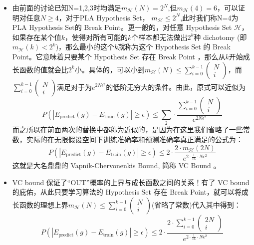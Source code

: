 \documentclass[UTF8]{article}%
\begin{document}
\begin{enumerate}
\begin{itemize}
\begin{description}
				\end{description}
				\item 由前面的讨论已知N=1,2,3时均满足$m_{\mathcal{H}}(N)=2^N$,但$m_{\mathcal{H}}(4)=6$，可以证明对任意$N \geq 4$，对于PLA Hypothesis Set， $m_\mathcal{H} \le 2^N$,此时我们称N=4为PLA Hypothesis Set的 Break Point。更一般的，对任意 Hypothesis Set ${\mathcal{H}} $，如果存在某个值$k$，使得对所有可能的$k$个样本都无法做出$2^k$种 dichotomy (即$m_\mathcal{H}(k)<2^{k}$)，那么最小的这个$k$就称为这个 Hypothesis Set 的 Break Point。它意味着只要某个 Hypothesis Set 存在 Break Point ，那么从$k$开始成长函数的值就会比$2^k$小。具体的，可以小到$m_{\mathcal{H}}(N) \leq \sum_{i=0}^{k-1} \left( \begin{array}{c}{N} \\ {i}\end{array}\right)$，而$\sum_{i=0}^{k-1} \left( \begin{array}{c}{N} \\ {i}\end{array}\right)$满足对于为$e^{2 N \epsilon^{2}}$的低阶无穷大的条件。由此，原式可以近似为
				$$
				P\left( | E_{\text {predict}}(g)-E_{\text {train}}(g) | \geq \epsilon\right) \leq \sum_{2} \cdot \frac{\sum\limits_{i=0}^{k-1} \left( \begin{array}{c}{N} \\ {i}\end{array}\right)}{e^{2 N \epsilon^{2}}}
				$$
				而之所以在前面两次的替换中都称为\color{red}近似的\color{black}，是因为在这里我们省略了一些常数，实际的在无限假设空间下训练准确率和预测准确率真正满足的公式为：
				$$
				P\left( | E_{\text {predict}}(g)-E_{\text {train}}(g) | \geq \epsilon\right) \leq 2 \cdot \frac{2 \cdot m_{\mathcal{H}}(2 N)}{e^{2 \cdot \frac{1}{16} \cdot N \epsilon^{2}}}
				$$
				这就是大名鼎鼎的 Vapnik-Chervonenkis Bound, 简称 VC Bound 。
				\item VC bound 保证了“OUT”概率的上界与成长函数之间的关系！有了 VC bound 的庇佑，从此只要学习算法的 Hypothesis Set 存在 Break Point，就可以将成长函数的理想上界$m_{\mathcal{H}}(N) \leq \sum_{i=0}^{k-1} \left( \begin{array}{c}{N} \\ {i}\end{array}\right)$(省略了常数)代入其中得到：
				$$
				P\left( | E_{\text {predict}}(g)-E_{\text {train}}(g) | \geq \epsilon\right) \leq 2 \cdot \frac{2 \cdot \sum\limits_{i=0}^{k-1} \left( \begin{array}{c}{2 N} \\ {i}\end{array}\right)}{e^{2 \cdot \frac{1}{16} \cdot N \epsilon^{2}}}
$$
\end{itemize}
\end{enumerate}
\end{document}
